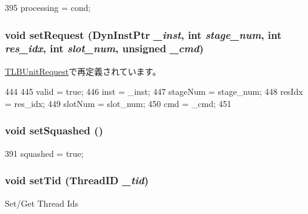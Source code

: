 \begin{DoxyCode}
395 { processing = cond; }
\end{DoxyCode}
\hypertarget{classResourceRequest_a119047fd563fe0c2e38e62dfb3be1dac}{
\subsubsection[{setRequest}]{\setlength{\rightskip}{0pt plus 5cm}void setRequest ({\bf DynInstPtr} {\em \_\-inst}, \/  int {\em stage\_\-num}, \/  int {\em res\_\-idx}, \/  int {\em slot\_\-num}, \/  unsigned {\em \_\-cmd})}}
\label{classResourceRequest_a119047fd563fe0c2e38e62dfb3be1dac}


\hyperlink{classTLBUnitRequest_aff267a8ca11b384ffb71af061c690e2d}{TLBUnitRequest}で再定義されています。


\begin{DoxyCode}
444 {
445     valid = true;
446     inst = _inst;
447     stageNum = stage_num;
448     resIdx = res_idx;
449     slotNum = slot_num;
450     cmd = _cmd;
451 }
\end{DoxyCode}
\hypertarget{classResourceRequest_abfa7b30b342b5ef70b7e060b305a2f94}{
\subsubsection[{setSquashed}]{\setlength{\rightskip}{0pt plus 5cm}void setSquashed ()}}
\label{classResourceRequest_abfa7b30b342b5ef70b7e060b305a2f94}



\begin{DoxyCode}
391 { squashed = true; }
\end{DoxyCode}
\hypertarget{classResourceRequest_a15517d4cd5ca229f6b178308b037e44a}{
\subsubsection[{setTid}]{\setlength{\rightskip}{0pt plus 5cm}void setTid ({\bf ThreadID} {\em \_\-tid})}}
\label{classResourceRequest_a15517d4cd5ca229f6b178308b037e44a}
Set/Get Thread Ids 


